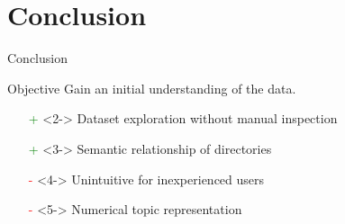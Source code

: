 \section{Conclusion}
\begin{frame}{Conclusion}
    \begin{exampleblock}{Objective} 
    Gain an initial understanding of the data.
    \end{exampleblock}
    \begin{itemize}
        \item[\textcolor{green}{+}]<2-> Dataset exploration without manual inspection
        \item[\textcolor{green}{+}]<3-> Semantic relationship of directories
        \item[\textcolor{red}{-}]<4-> Unintuitive for inexperienced users
        \item[\textcolor{red}{-}]<5-> Numerical topic representation
    \end{itemize}
\end{frame}
